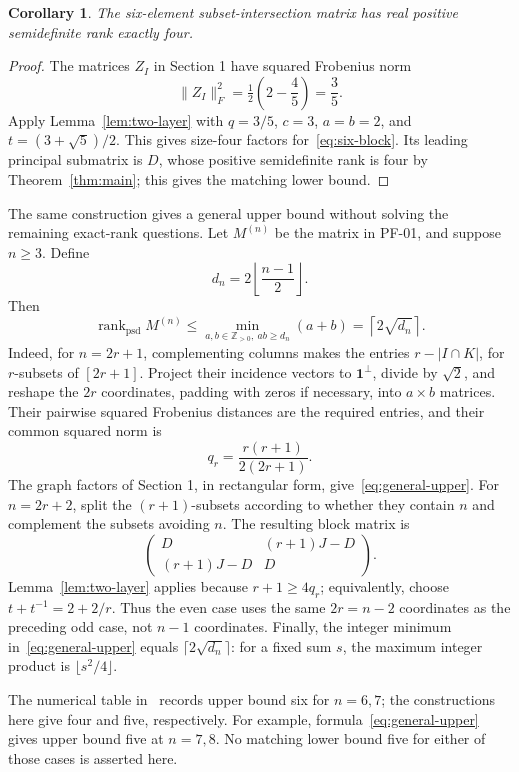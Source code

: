 \documentclass[11pt]{article}
\newtheorem{corollary}[theorem]{Corollary}
\begin{document}
\begin{corollary}\label{cor:six}
The six-element subset-intersection matrix has real positive semidefinite rank exactly four.
\end{corollary}
\begin{proof}
The matrices $Z_I$ in Section 1 have squared Frobenius norm
\[
 \|Z_I\|_F^2=\tfrac12\left(2-\frac45\right)=\frac35.
\]
Apply Lemma~\ref{lem:two-layer} with $q=3/5$, $c=3$, $a=b=2$, and $t=(3+\sqrt5)/2$. This gives size-four factors for~\eqref{eq:six-block}. Its leading principal submatrix is $D$, whose positive semidefinite rank is four by Theorem~\ref{thm:main}; this gives the matching lower bound.
\end{proof}

The same construction gives a general upper bound without solving the remaining exact-rank questions. Let $M^{(n)}$ be the matrix in PF-01, and suppose $n\geq3$. Define
\[
 d_n=2\left\lfloor\frac{n-1}{2}\right\rfloor.
\]
Then
\begin{equation}\label{eq:general-upper}
 \operatorname{rank}_{\mathrm{psd}}M^{(n)}
 \leq\min_{a,b\in\mathbb Z_{>0},\ ab\geq d_n}(a+b)
 =\left\lceil2\sqrt{d_n}\right\rceil.
\end{equation}
Indeed, for $n=2r+1$, complementing columns makes the entries $r-|I\cap K|$, for $r$-subsets of $[2r+1]$. Project their incidence vectors to $\mathbf1^\perp$, divide by $\sqrt2$, and reshape the $2r$ coordinates, padding with zeros if necessary, into $a\times b$ matrices. Their pairwise squared Frobenius distances are the required entries, and their common squared norm is
\[
 q_r=\frac{r(r+1)}{2(2r+1)}.
\]
The graph factors of Section 1, in rectangular form, give~\eqref{eq:general-upper}. For $n=2r+2$, split the $(r+1)$-subsets according to whether they contain $n$ and complement the subsets avoiding $n$. The resulting block matrix is
\[
 \begin{pmatrix}D&(r+1)J-D\\(r+1)J-D&D\end{pmatrix}.
\]
Lemma~\ref{lem:two-layer} applies because $r+1\geq4q_r$; equivalently, choose $t+t^{-1}=2+2/r$. Thus the even case uses the same $2r=n-2$ coordinates as the preceding odd case, not $n-1$ coordinates. Finally, the integer minimum in~\eqref{eq:general-upper} equals $\lceil2\sqrt{d_n}\rceil$: for a fixed sum $s$, the maximum integer product is $\lfloor s^2/4\rfloor$.

The numerical table in~\cite[Section 4.2]{vgg} records upper bound six for $n=6,7$; the constructions here give four and five, respectively. For example, formula~\eqref{eq:general-upper} gives upper bound five at $n=7,8$. No matching lower bound five for either of those cases is asserted here.
\end{document}
